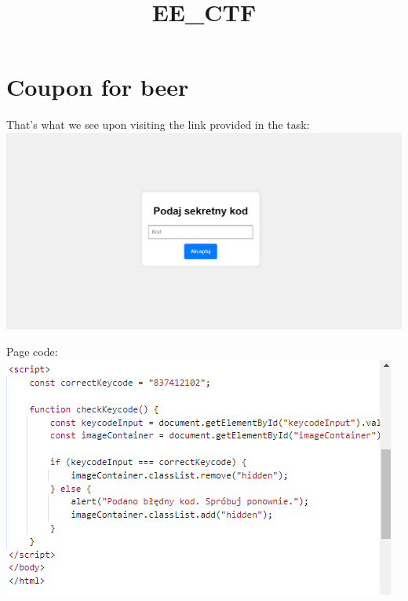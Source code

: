 \documentclass{article}
\title{\textbf{EE\_CTF}}
\author{}
\date{}
\begin{document}
\maketitle
\tableofcontents
\newpage

\section{Coupon for beer}
That's what we see upon visiting the link provided in the task:
\vspace{3mm} \\
\includegraphics[width=\textwidth]{"image1.png"}

Page code: \\
\includegraphics[width=\textwidth]{"image2.png"}
\end{document}
